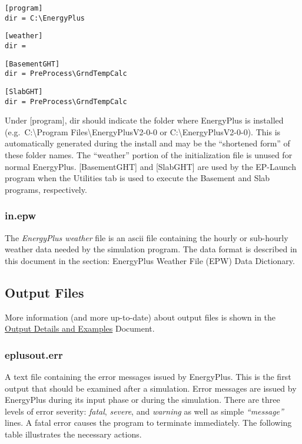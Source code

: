 \begin{lstlisting}
[program]
dir = C:\EnergyPlus
\end{lstlisting}

\begin{lstlisting}
[weather]
dir =
\end{lstlisting}

\begin{lstlisting}
[BasementGHT]
dir = PreProcess\GrndTempCalc
\end{lstlisting}

\begin{lstlisting}
[SlabGHT]
dir = PreProcess\GrndTempCalc
\end{lstlisting}

Under {[}program{]}, dir should indicate the folder where EnergyPlus is installed (e.g.~C:\textbackslash{}Program Files\textbackslash{}EnergyPlusV2-0-0 or C:\textbackslash{}EnergyPlusV2-0-0). This is automatically generated during the install and may be the ``shortened form'' of these folder names. The ``weather'' portion of the initialization file is unused for normal EnergyPlus. {[}BasementGHT{]} and {[}SlabGHT{]} are used by the EP-Launch program when the Utilities tab is used to execute the Basement and Slab programs, respectively.

\subsubsection{in.epw}\label{in.epw}

The \emph{EnergyPlus weather} file is an ascii file containing the hourly or sub-hourly weather data needed by the simulation program. The data format is described in this document in the section: EnergyPlus Weather File (EPW) Data Dictionary.

\subsection{Output Files}\label{output-files-000}

More information (and more up-to-date) about output files is shown in the \href{OutputDetailsAndExamples.pdf}{Output Details and Examples} Document.

\subsubsection{eplusout.err}\label{eplusout.err}

A text file containing the error messages issued by EnergyPlus. This is the first output that should be examined after a simulation. Error messages are issued by EnergyPlus during its input phase or during the simulation. There are three levels of error severity: \emph{fatal}, \emph{severe}, and \emph{warning} as well as simple \emph{``message''} lines. A fatal error causes the program to terminate immediately. The following table illustrates the necessary actions.


